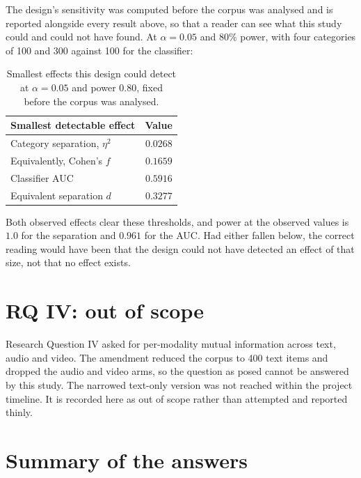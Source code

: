 The design's sensitivity was computed before the corpus was analysed and is reported
alongside every result above, so that a reader can see what this study could and could not
have found. At $\alpha = 0.05$ and $80\%$ power, with four categories of 100 and 300 against
100 for the classifier:

\begin{table}[htbp]
\centering
\begin{tabular}{@{}lr@{}}
\toprule
\textbf{Smallest detectable effect} & \textbf{Value} \\
\midrule
Category separation, $\eta^2$ & $0.0268$ \\
Equivalently, Cohen's $f$      & $0.1659$ \\
Classifier AUC                 & $0.5916$ \\
Equivalent separation $d$      & $0.3277$ \\
\bottomrule
\end{tabular}
\caption{Smallest effects this design could detect at $\alpha = 0.05$ and power $0.80$, fixed before the corpus was analysed.}
\label{tab:power}
\end{table}

Both observed effects clear these thresholds, and power at the observed values is $1.0$ for
the separation and $0.961$ for the AUC. Had either fallen below, the correct reading would
have been that the design could not have detected an effect of that size, not that no effect
exists.

\section{RQ IV: out of scope}

Research Question IV asked for per-modality mutual information across text, audio and video.
The amendment reduced the corpus to 400 text items and dropped the audio and video arms, so
the question as posed cannot be answered by this study. The narrowed text-only version was
not reached within the project timeline. It is recorded here as out of scope rather than
attempted and reported thinly.

\section{Summary of the answers}

